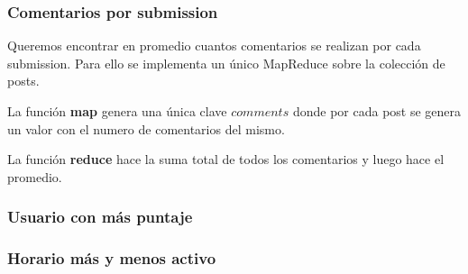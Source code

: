 \subsubsection{Comentarios por submission}

Queremos encontrar en promedio cuantos comentarios se realizan por cada submission. Para ello se implementa un único MapReduce sobre la colección de posts.


La función \textbf{map} genera una única clave $comments$ donde por cada post se genera un valor con el numero de comentarios del mismo.


La función \textbf{reduce} hace la suma total de todos los comentarios y luego hace el promedio.

\subsubsection{Usuario con más puntaje}
\subsubsection{Horario más y menos activo}

